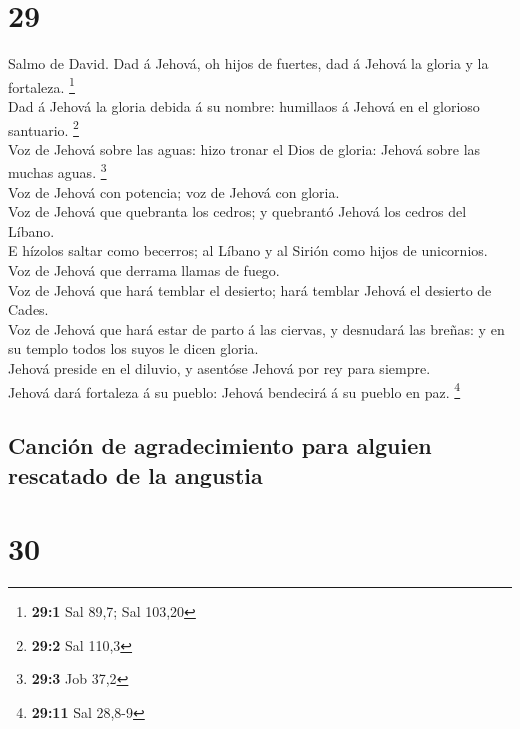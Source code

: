 \hypertarget{section-28}{%
\section{29}\label{section-28}}

 Salmo de David. Dad á Jehová, oh hijos de fuertes, dad á
Jehová la gloria y la fortaleza. \footnote{\textbf{29:1} Sal 89,7; Sal
  103,20}\\
 Dad á Jehová la gloria debida á su nombre: humillaos á
Jehová en el glorioso santuario. \footnote{\textbf{29:2} Sal 110,3}\\
 Voz de Jehová sobre las aguas: hizo tronar el Dios de
gloria: Jehová sobre las muchas aguas. \footnote{\textbf{29:3} Job 37,2}\\
 Voz de Jehová con potencia; voz de Jehová con gloria.\\
 Voz de Jehová que quebranta los cedros; y quebrantó
Jehová los cedros del Líbano.\\
 E hízolos saltar como becerros; al Líbano y al Sirión
como hijos de unicornios.\\
 Voz de Jehová que derrama llamas de fuego.\\
 Voz de Jehová que hará temblar el desierto; hará temblar
Jehová el desierto de Cades.\\
 Voz de Jehová que hará estar de parto á las ciervas, y
desnudará las breñas: y en su templo todos los suyos le dicen gloria.\\
 Jehová preside en el diluvio, y asentóse Jehová por rey
para siempre.\\
 Jehová dará fortaleza á su pueblo: Jehová bendecirá á su
pueblo en paz. \footnote{\textbf{29:11} Sal 28,8-9}

\hypertarget{canciuxf3n-de-agradecimiento-para-alguien-rescatado-de-la-angustia}{%
\subsection{Canción de agradecimiento para alguien rescatado de la
angustia}\label{canciuxf3n-de-agradecimiento-para-alguien-rescatado-de-la-angustia}}

\hypertarget{section-29}{%
\section{30}\label{section-29}}

